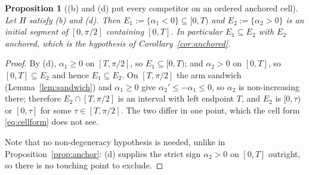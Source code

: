 \documentclass[11pt]{article}
\newtheorem{proposition}[theorem]{Proposition}
\theoremstyle{definition}
\begin{document}
\begin{proposition}[(b) and (d) put every competitor on an ordered anchored cell]
\label{prop:dcell}
Let $H$ satisfy (b) and (d). Then $E_1:=\{\alpha_1<0\}\subseteq[0,T)$ and
$E_2:=\{\alpha_2>0\}$ is an initial segment of $[0,\pi/2]$ containing $[0,T]$. In particular
$E_1\subseteq E_2$ with $E_2$ anchored, which is the hypothesis of
Corollary~\ref{cor:anchored}.
\end{proposition}

\begin{proof}
By (d), $\alpha_1\ge0$ on $[T,\pi/2]$, so $E_1\subseteq[0,T)$; and $\alpha_2>0$ on $[0,T]$,
so $[0,T]\subseteq E_2$ and hence $E_1\subseteq E_2$. On $[T,\pi/2]$ the arm sandwich
(Lemma~\ref{lem:sandwich}) and $\alpha_1\ge0$ give $\alpha_2'\le-\alpha_1\le0$, so $\alpha_2$
is non-increasing there; therefore $E_2\cap[T,\pi/2]$ is an interval with left endpoint $T$,
and $E_2$ is $[0,\tau)$ or $[0,\tau]$ for some $\tau\in[T,\pi/2]$. The two differ in one
point, which the cell form \eqref{eq:cellform} does not see.

Note that no non-degeneracy hypothesis is needed, unlike in Proposition~\ref{prop:anchor}:
(d) supplies the strict sign $\alpha_2>0$ on $[0,T]$ outright, so there is no touching point
to exclude.
\end{proof}
\end{document}
